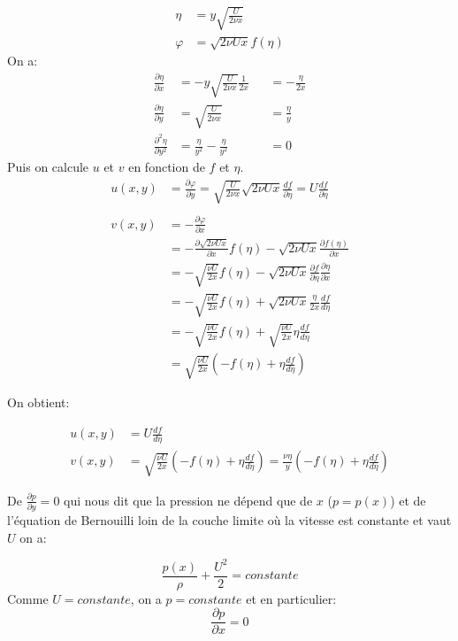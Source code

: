 \documentclass[french]{article}
\begin{document}
\begin{align*}
	\eta &= y \sqrt{\frac{U}{2\nu x }} \\
	\varphi &= \sqrt{2\nu U x} f(\eta)
\end{align*}
On a:
\begin{align*}
	\frac{\partial \eta}{\partial x} &= 
		-y\sqrt{\frac{U}{2\nu x}}\frac{1}{2x} &&= 
		-\frac{\eta}{2x}\\
		\frac{\partial \eta}{\partial y} &=
		\sqrt{\frac{U}{2\nu x }} &&= \frac{\eta}{y}\\
		\frac{\partial^{2} \eta}{\partial y^{2}} &= 
		\frac{\eta}{y^{2}} - \frac{\eta}{y^{2}} &&= 0
\end{align*}
Puis on calcule $u$ et $v$ en fonction de $f$ et $\eta$.
\begin{align*}
	u(x,y) &= 
	\frac{\partial \varphi}{\partial y} 
	=
	\sqrt{\frac{U}{2\nu x }} \sqrt{2\nu U x}\frac{d f}{\partial \eta}
	= U \frac{d f}{\partial \eta}\\
	\\
	v(x,y) &= 
	- \frac{\partial \varphi}{\partial x} \\
	&=
	-\frac{\partial \sqrt{2\nu U x}} {\partial x}
	f(\eta) -
	\sqrt{2\nu Ux }
	\frac{\partial f(\eta)}{\partial x}\\
	&= 
	-\sqrt{\frac{\nu U}{2x}}
	f(\eta) -
	\sqrt{2\nu Ux }
	\frac{\partial f}{\partial \eta}
	\frac{\partial \eta}{\partial x}\\
	&=
	-\sqrt{\frac{\nu U}{2x}}
	f(\eta) +
	\sqrt{2\nu Ux}\frac{\eta}{2x}\frac{d f}{d \eta}
	\\
	&=
	-\sqrt{\frac{\nu U}{2x}}
	f(\eta) +
	\sqrt{\frac{\nu U}{2x}}\eta\frac{d f}{d \eta}
	\\
	&=
	\sqrt{\frac{\nu U}{2x}}
	\left(
	-f(\eta) + \eta\frac{d f}{d \eta}
	\right)
\end{align*}

On obtient:

\begin{align}
	u(x,y) &= 
	 U \frac{d f}{d \eta}\\
	v(x,y) &= 
	\sqrt{\frac{\nu U}{2x}}
	\left(
	-f(\eta) + \eta\frac{d f}{d \eta}
	\right) = 
	\frac{\nu\eta}{y}
	\left(
	-f(\eta) + \eta\frac{d f}{d \eta}
	\right)
\end{align}

De $\frac{\partial p}{\partial y} = 0$ qui nous dit que la pression ne dépend que de $x$ ($p = p(x)$) et de l'équation de Bernouilli loin de la couche limite où la vitesse est constante et vaut $U$ on a:


\begin{equation*}
	\frac{p(x)}{\rho} + \frac{U^2}{2} = constante
\end{equation*}
Comme $U = constante$, on a $p = constante$ et en particulier:
\begin{equation}
	\frac{\partial p}{\partial x}  = 0
\end{equation}
\end{document}
